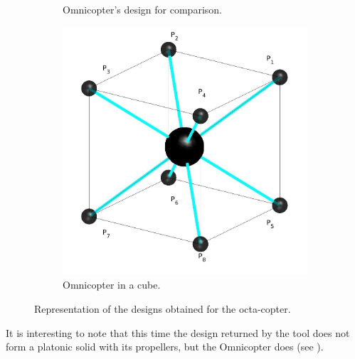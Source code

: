 \begin{figure}[!ht]
{\begin{subfigure}[b]{0.6\textwidth}
    \caption{Omnicopter's design for comparison.} \label{fig:Octacopter_resultb}
  \end{subfigure}
  \hspace*{\fill} %
  \begin{subfigure}[b]{0.5\textwidth}
    \includegraphics[width=\linewidth]{images/Octa_cube.jpg}
    \caption{Omnicopter in a cube.} \label{fig:Octacopter_resultc}
  \end{subfigure}}
  \caption{Representation of the designs obtained for the octa-copter.}
  \label{fig:Octacopter_result}
\end{figure}

It is interesting to note that this time the design returned by the tool does not
form a platonic solid with its propellers, but the Omnicopter does (see
).

